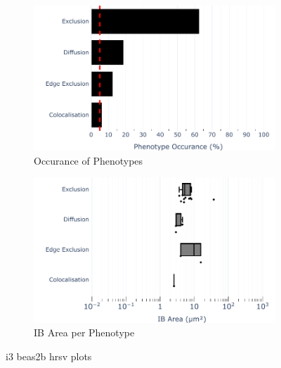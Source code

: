 \begin{figure}
    \begin{subfigure}{0.5\textwidth}
        \includegraphics[width=1\linewidth]{09. Chapter 4/Figs/02. Infection/02. IFIT3/04. bar_i3_beas2b.pdf} 
        \caption[]{Occurance of Phenotypes}
    \end{subfigure}
    \begin{subfigure}{0.5\textwidth}
        \includegraphics[width=1\linewidth]{09. Chapter 4/Figs/02. Infection/02. IFIT3/05. box_i3_beas2b.pdf}
        \caption[]{IB Area per Phenotype}
    \end{subfigure}
    \caption[i3 beas2b hrsv plots]{i3 beas2b hrsv plots}
    \label{fig:i3 beas2b hrsv plots}
\end{figure}

